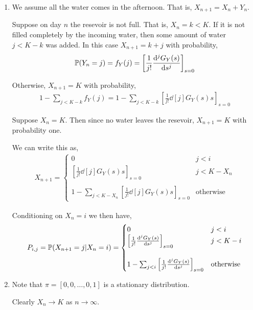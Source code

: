 \begin{solution}[Solution]
\begin{enumerate}[label=(\alph*)]
    \item 
        We assume all the water comes in the afternoon. That is, \( X_{n+1} = X_n + Y_n \).

        Suppose on day \( n \) the resevoir is not full. That is, \( X_n = k < K \). If it is not filled completely by the incoming water, then some amount of water \( j < K-k \) was added. In this case \( X_{n+1} = k+j \) with probability,
        \begin{align*}
            \PP(Y_n = j) = f_Y(j) = 
            \left[\frac{1}{j!}\dd[j]{G_Y(s)}{s} \right]_{s=0}
        \end{align*}
        
        Otherwise, \( X_{n+1} = K \) with probability,
        \begin{align*}
            1-\sum_{j < K-k} f_Y(j) = 1 - \sum_{j<K-k} \left[\frac{1}{j!} \dd[j]{G_Y(s)}{s} \right]_{s=0}
        \end{align*}
        
        Suppose \( X_n = K \). Then since no water leaves the resevoir, \( X_{n+1} = K \) with probability one.

        We can write this as,
        \begin{align*}
            X_{n+1} = \begin{cases}
                0 & j < i \\
                \left[\frac{1}{j!}\dd[j]{G_Y(s)}{s} \right]_{s=0} & j < K - X_n \\ \\
                1 - \sum_{j<K-X_n} \left[\frac{1}{j!}\dd[j]{G_Y(s)}{s} \right]_{s=0} & \text{otherwise}
            \end{cases}
        \end{align*}
       
        Conditioning on \( X_n = i \) we then have,
        \begin{align*}
            P_{i,j} = \PP(X_{n+1} = j | X_n = i) = 
             \begin{cases}
                0 & j < i \\
                \left[\frac{1}{j!}\dd[j]{G_Y(s)}{s} \right]_{s=0} & j < K - i \\ \\
                1 - \sum_{j<i} \left[\frac{1}{j!}\dd[j]{G_Y(s)}{s} \right]_{s=0} & \text{otherwise}
            \end{cases}
        \end{align*}


    \item
        Note that \( \pi = [0,0,\ldots,0,1] \) is a stationary distribution.



        Clearly \( X_n \to K \) as \( n\to\infty \).

        
\end{enumerate}
\end{solution}

